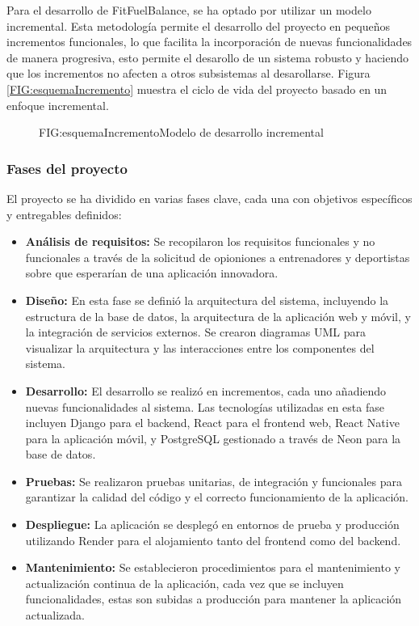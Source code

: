 Para el desarrollo de FitFuelBalance, se ha optado por utilizar un modelo incremental. Esta metodología permite el desarrollo del proyecto en pequeños incrementos funcionales, lo que facilita la incorporación de nuevas funcionalidades de manera progresiva, esto permite el desarollo de un sistema robusto y haciendo que los incrementos no afecten a otros subsistemas al desarollarse. Figura \ref{FIG:esquemaIncremento} muestra el ciclo de vida del proyecto basado en un enfoque incremental.

\begin{figure}[Esquema Modelo Incremental]{FIG:esquemaIncremento}{Modelo de desarrollo incremental}
\end{figure}

\subsubsection{Fases del proyecto}

El proyecto se ha dividido en varias fases clave, cada una con objetivos específicos y entregables definidos:

\begin{itemize}
    \item \textbf{Análisis de requisitos:} Se recopilaron los requisitos funcionales y no funcionales a través de la solicitud de opioniones a entrenadores y deportistas sobre que esperarían de una aplicación innovadora.

    \item \textbf{Diseño:} En esta fase se definió la arquitectura del sistema, incluyendo la estructura de la base de datos, la arquitectura de la aplicación web y móvil, y la integración de servicios externos. Se crearon diagramas UML para visualizar la arquitectura y las interacciones entre los componentes del sistema.

    \item \textbf{Desarrollo:} El desarrollo se realizó en incrementos, cada uno añadiendo nuevas funcionalidades al sistema. Las tecnologías utilizadas en esta fase incluyen Django para el backend, React para el frontend web, React Native para la aplicación móvil, y PostgreSQL gestionado a través de Neon para la base de datos.

    \item \textbf{Pruebas:} Se realizaron pruebas unitarias, de integración y funcionales para garantizar la calidad del código y el correcto funcionamiento de la aplicación.

    \item \textbf{Despliegue:} La aplicación se desplegó en entornos de prueba y producción utilizando Render para el alojamiento tanto del frontend como del backend.

    \item \textbf{Mantenimiento:} Se establecieron procedimientos para el mantenimiento y actualización continua de la aplicación, cada vez que se incluyen funcionalidades, estas son subidas a producción para mantener la aplicación actualizada.

\end{itemize}

